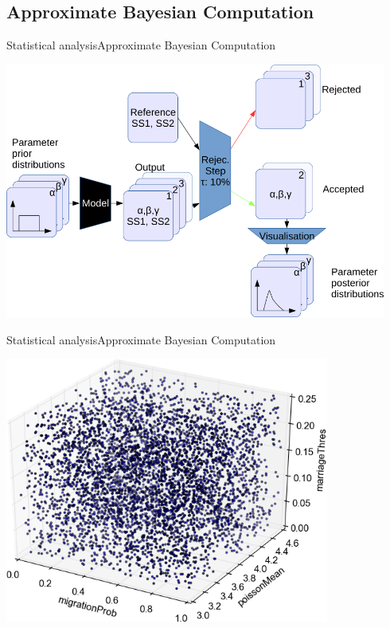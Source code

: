 \documentclass[10pt, aspectratio=43]{beamer}
\begin{document}
\subsection{Approximate Bayesian Computation}
\begin{frame}{Statistical analysis}{Approximate Bayesian Computation}
\begin{center}
  \includegraphics[width=0.94\textwidth]{../data/abc-landscape.png}
\end{center}
\end{frame}

\begin{frame}{Statistical analysis}{Approximate Bayesian Computation}
\begin{center}
  \includegraphics[width=0.8\textwidth]{../data/abc-space.png}
\end{center}
\end{frame}
\end{document}
